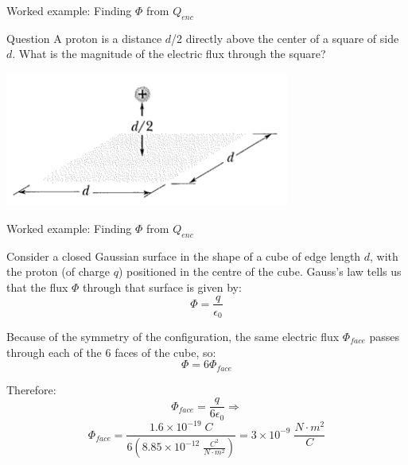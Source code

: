 %
%

%

{
\problemslide

%
%
%

\begin{frame}{Worked example: Finding $\Phi$ from $Q_{enc}$}

  \begin{blockexmplque}{Question}
       A proton is a distance $d$/2 directly above the center of a square of side $d$.
    	 What is the magnitude of the electric flux through the square?
       \begin{center}
           \includegraphics[width=0.70\textwidth]{./images/problems/lect02_charge_above_surface.png}
       \end{center}
  \end{blockexmplque}

\end{frame}

%
%
%

\begin{frame}{Worked example: Finding $\Phi$ from $Q_{enc}$}

  Consider a closed Gaussian surface in the shape of a cube of edge length $d$,
  with the proton (of charge $q$) positioned in the centre of the cube.
  Gauss's law tells us that the flux $\Phi$ through that surface is given by:
  \begin{equation*}
  	\Phi = \frac{q}{\epsilon_0}
  \end{equation*}

  Because of the symmetry of the configuration, the same electric flux
  $\Phi_{face}$ passes through each of the 6 faces of the cube, so:
  \begin{equation*}
  	\Phi = 6 \Phi_{face}
  \end{equation*}

  Therefore:
  \begin{equation*}
  	\Phi_{face} = \frac{q}{6 \epsilon_0} \Rightarrow
  \end{equation*}
  \begin{equation*}
  	\Phi_{face} =
  	 \frac{1.6 \times 10^{-19} \; C}
  	      {6 (8.85 \times 10^{-12} \; \frac{C^2}{N \cdot m^2})} =
          3 \times 10^{-9} \; \frac{N \cdot m^2}{C}
  \end{equation*}

\end{frame}

} %

